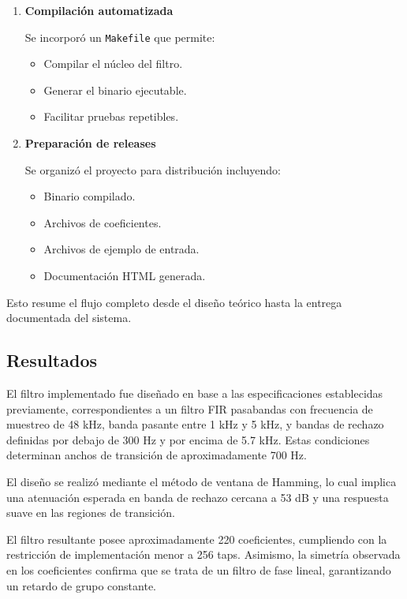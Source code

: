 \documentclass[a4,11pt]{article}
\begin{document}
\begin{enumerate}
La documentación fue generada utilizando Doxygen 1.15.0, produciendo una interfaz HTML navegable.

\item \textbf{Compilación automatizada}

Se incorporó un \texttt{Makefile} que permite:
\begin{itemize}
\item Compilar el núcleo del filtro.
\item Generar el binario ejecutable.
\item Facilitar pruebas repetibles.
\end{itemize}

\item \textbf{Preparación de releases}

Se organizó el proyecto para distribución incluyendo:
\begin{itemize}
\item Binario compilado.
\item Archivos de coeficientes.
\item Archivos de ejemplo de entrada.
\item Documentación HTML generada.
\end{itemize}

\end{enumerate}

Esto resume el flujo completo desde el diseño teórico hasta la entrega documentada del sistema.

\subsection{Resultados}
\label{sec:resultados}

El filtro implementado fue diseñado en base a las especificaciones establecidas previamente, correspondientes a un filtro FIR pasabandas con frecuencia de muestreo de 48 kHz, banda pasante entre 1 kHz y 5 kHz, y bandas de rechazo definidas por debajo de 300 Hz y por encima de 5.7 kHz. Estas condiciones determinan anchos de transición de aproximadamente 700 Hz.

El diseño se realizó mediante el método de ventana de Hamming, lo cual implica una atenuación esperada en banda de rechazo cercana a 53 dB y una respuesta suave en las regiones de transición.

El filtro resultante posee aproximadamente 220 coeficientes, cumpliendo con la restricción de implementación menor a 256 taps. Asimismo, la simetría observada en los coeficientes confirma que se trata de un filtro de fase lineal, garantizando un retardo de grupo constante.
\end{document}
